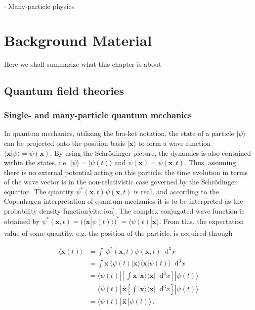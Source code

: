 \documentclass[12pt]{report}
\renewcommand{\vec}[1]{\boldsymbol{\mathbf{#1}}}                        %
\newcommand*\diff{\mathop{}\!\mathrm{d}}
\newcommand{\todo}[1]{{\leavevmode\color{todo}#1}}
\begin{document}
\todo{$ \cdot $ Many-particle physics}



\chapter{Background Material}

\todo{Here we shall summarize what this chapter is about}

\section{Quantum field theories}

\subsection{Single- and many-particle quantum mechanics}

In quantum mechanics, utilizing the bra-ket notation, the state of a particle $ | \psi \rangle $ can be projected onto the position basis $ | \vec x \rangle $ to form a wave function $ \langle \vec x | \psi \rangle = \psi (\vec x) $. By using the Schrödinger picture, the dynamics is also contained within the states, i.e. $ | \psi \rangle = | \psi (t) \rangle $ and $ \psi(\vec x) = \psi(\vec x, t) $. Thus, assuming there is no external potential acting on this particle, the time evolution in terms of the wave vector is in the non-relativistic case governed by the Schrödinger equation. The quantity $ \psi^*(\vec x, t) \psi(\vec x, t) $ is real, and according to the Copenhagen interpretation of quantum mechanics it is to be interpreted as the probability density function\todo{[citation]}. The complex conjugated wave function is obtained by $ \psi^*(\vec x, t) = (\langle \vec x | \psi(t) \rangle)^* = \langle \psi(t) | \vec x \rangle $. From this, the expectation value of some quantity, e.g. the position of the particle, is acquired through

\begin{equation}
	\begin{split}
		\langle \vec x(t) \rangle
		&= \int \, \psi^*(\vec x, t) \psi(\vec x, t) \diff^3x \\
		&= \int \vec x \, \langle \psi(t) | \vec x \rangle \langle \vec x | \psi(t) \rangle \diff^3x \\
		&= \langle \psi(t) | \left[ \int \vec x \, | \vec x \rangle \langle \vec x | \diff^3x \right] | \psi(t) \rangle \\
		&= \langle \psi(t) | \, \hat{\vec x} \left[ \int | \vec x \rangle \langle \vec x | \diff^3x \right] | \psi(t) \rangle \\
		&= \langle \psi(t) | \, \hat{\vec x} \, | \psi(t) \rangle \,.
	\end{split}
\end{equation}
\end{document}
